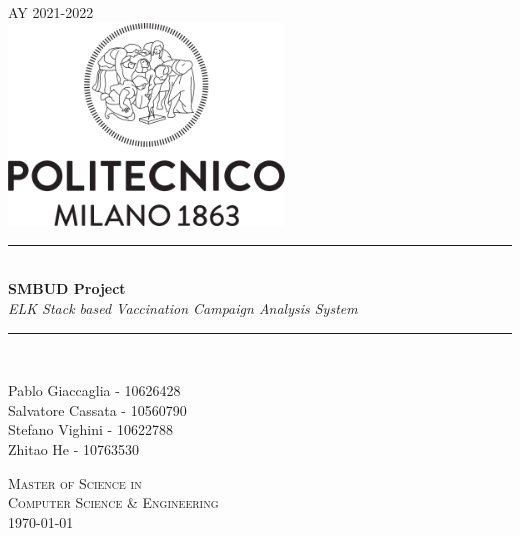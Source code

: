 \documentclass{article}[IEEEtran]
\newcommand{\HRule}{\rule{\linewidth}{0.5mm}}
\begin{document}
\begin{titlepage}
\begin{center}

\captionsetup{font=footnotesize}

\textsc{AY 2021-2022}\\[2cm]

\includegraphics[width=0.55\textwidth]{logo.png}~\\[2cm]


\HRule \\[0.4cm]
{ \LARGE 
  \textbf{SMBUD Project}\\[0.4cm]
  \emph{ELK Stack based Vaccination Campaign Analysis System}\\[0.4cm]
}
\HRule \\[1.5cm]



\begin{center}
    {\large Pablo Giaccaglia - 10626428\\[0.1cm]    Salvatore Cassata - 10560790\\[0.1cm]  Stefano Vighini - 10622788\\[0.1cm]  Zhitao He - 10763530\\[0.1cm] 
}
\end{center}

\vfill

\textsc{\large Master of Science in \\Computer Science \& Engineering}\\[0.4cm]


{\large \today}
 
\end{center}
\end{titlepage}

\newpage


\tableofcontents
{}
\newpage
\setcounter{page}{1}
\end{document}
